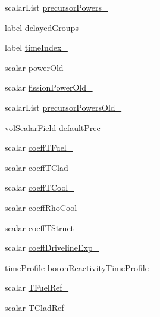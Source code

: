 \begin{DoxyCompactItemize}
\item 
scalar\+List \hyperlink{classFoam_1_1pointKineticNeutronics_a1da852a1ae2da3d65edbdb42b7cf321b}{precursor\+Powers\+\_\+}
\item 
label \hyperlink{classFoam_1_1pointKineticNeutronics_a7a268e5643e8fc4243d5f1a675c2e294}{delayed\+Groups\+\_\+}
\item 
label \hyperlink{classFoam_1_1pointKineticNeutronics_ae0cc976f06281b9f1087412c1270f34b}{time\+Index\+\_\+}
\item 
scalar \hyperlink{classFoam_1_1pointKineticNeutronics_a8e5d84b6d14e1d69653cdae3df117b49}{power\+Old\+\_\+}
\item 
scalar \hyperlink{classFoam_1_1pointKineticNeutronics_a9d6f43ed0592bb9fd374f3b25cab7c0c}{fission\+Power\+Old\+\_\+}
\item 
scalar\+List \hyperlink{classFoam_1_1pointKineticNeutronics_a07c93a3fb0a962eb03752cfca9b42975}{precursor\+Powers\+Old\+\_\+}
\item 
vol\+Scalar\+Field \hyperlink{classFoam_1_1pointKineticNeutronics_ad421eb70060f1b275d7e9814cc52830a}{default\+Prec\+\_\+}
\item 
scalar \hyperlink{classFoam_1_1pointKineticNeutronics_abca61f725141f0265193f248a31fe110}{coeff\+T\+Fuel\+\_\+}
\item 
scalar \hyperlink{classFoam_1_1pointKineticNeutronics_a099c08cf97a992d35e65456a782de777}{coeff\+T\+Clad\+\_\+}
\item 
scalar \hyperlink{classFoam_1_1pointKineticNeutronics_a871e26f699d891cca086302f031b9e26}{coeff\+T\+Cool\+\_\+}
\item 
scalar \hyperlink{classFoam_1_1pointKineticNeutronics_a17537b18c9f32a7b7e0a0491691ae5a2}{coeff\+Rho\+Cool\+\_\+}
\item 
scalar \hyperlink{classFoam_1_1pointKineticNeutronics_aba3e13b813ec2a7047a3ff8a0b674fad}{coeff\+T\+Struct\+\_\+}
\item 
scalar \hyperlink{classFoam_1_1pointKineticNeutronics_ab09baf31508e314218a09f358f9e4851}{coeff\+Driveline\+Exp\+\_\+}
\item 
\hyperlink{classFoam_1_1timeProfile}{time\+Profile} \hyperlink{classFoam_1_1pointKineticNeutronics_aadd1831eaafa067b3307df02730927bd}{boron\+Reactivity\+Time\+Profile\+\_\+}
\item 
scalar \hyperlink{classFoam_1_1pointKineticNeutronics_afc3e10bcb57b682cb155c12efa5c40c6}{T\+Fuel\+Ref\+\_\+}
\item 
scalar \hyperlink{classFoam_1_1pointKineticNeutronics_a4375d26fceb5896501a96002b467e01c}{T\+Clad\+Ref\+\_\+}

\end{DoxyCompactItemize}
